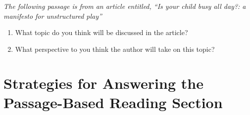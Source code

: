 \bigskip
\textit{The following passage is from an article entitled, ``Is your child busy all day?: a manifesto for unstructured play''}\\
\begin{enumerate}
\item What topic do you think will be discussed in the article? \hrulefill
\item What perspective to you think the author will take on this topic? \hrulefill
\end{enumerate}

\newpage
\section[Passage-Based Section]{Strategies for Answering the Passage-Based Reading Section}

